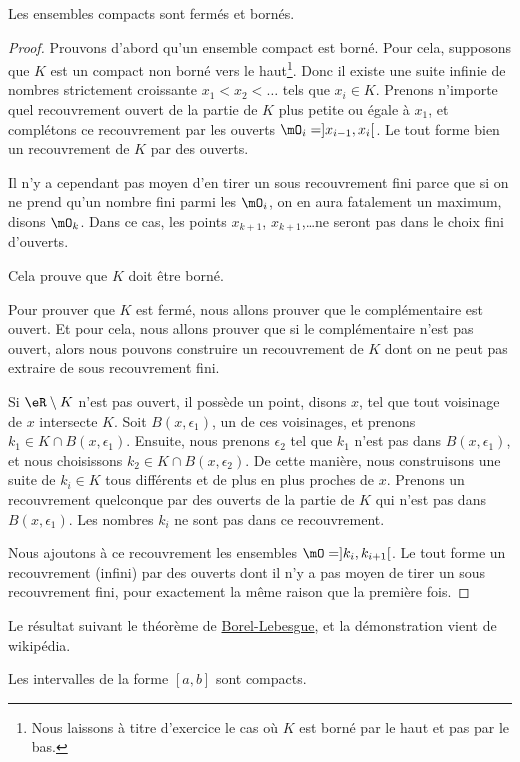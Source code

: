 \begin{proposition}
Les ensembles compacts sont fermés et bornés.
\end{proposition}

\begin{proof}
Prouvons d'abord qu'un ensemble compact est borné. Pour cela, supposons que $K$ est un compact non borné vers le haut\footnote{Nous laissons à titre d'exercice le cas où $K$ est borné par le haut et pas par le bas.}. Donc il existe une suite infinie de nombres strictement croissante $x_1<x_2<\ldots$ tels que $x_i\in K$. Prenons n'importe quel recouvrement ouvert de la partie de $K$ plus petite ou égale à $x_1$, et complétons ce recouvrement par les ouverts $\mO_i=]x_{i-1},x_i[$. Le tout forme bien un recouvrement de $K$ par des ouverts. 

Il n'y a cependant pas moyen d'en tirer un sous recouvrement fini parce que si on ne prend qu'un nombre fini parmi les $\mO_i$, on en aura fatalement un maximum, disons $\mO_k$. Dans ce cas, les points $x_{k+1}$, $x_{k+1}$,\ldots ne seront pas dans le choix fini d'ouverts.

Cela prouve que $K$ doit être borné.

Pour prouver que $K$ est fermé, nous allons prouver que le complémentaire est ouvert. Et pour cela, nous allons prouver que si le complémentaire n'est pas ouvert, alors nous pouvons construire un recouvrement de $K$ dont on ne peut pas extraire de sous recouvrement fini.

Si $\eR\setminus K$ n'est pas ouvert, il possède un point, disons $x$, tel que tout voisinage de $x$ intersecte $K$. Soit $B(x,\epsilon_1)$, un de ces voisinages, et prenons $k_1\in K\cap B(x,\epsilon_1)$. Ensuite, nous prenons $\epsilon_2$ tel que $k_1$ n'est pas dans $B(x,\epsilon_1)$, et nous choisissons $k_2\in K\cap B(x,\epsilon_2)$. De cette manière, nous construisons une suite de $k_i\in K$ tous différents et de plus en plus proches de $x$. Prenons un recouvrement quelconque par des ouverts de la partie de $K$ qui n'est pas dans $B(x,\epsilon_1)$. Les nombres $k_i$ ne sont pas dans ce recouvrement.

Nous ajoutons à ce recouvrement les ensembles $\mO=]k_i,k_{i+1}[$. Le tout forme un recouvrement (infini) par des ouverts dont il n'y a pas moyen de tirer un sous recouvrement fini, pour exactement la même raison que la première fois.
\end{proof}

Le résultat suivant le théorème de \href{http://fr.wikipedia.org/wiki/Théorème_de_Heine-Borel}{Borel-Lebesgue}, et la démonstration vient de wikipédia.
\begin{theorem}   \label{ThoBOrelLebesgue}
    Les intervalles de la forme $[a,b]$ sont compacts.
\end{theorem}

